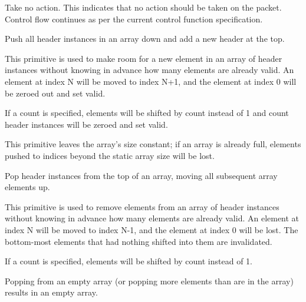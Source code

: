 \documentclass[12pt]{article}
\begin{document}

{ %
Take no action.
}
{ %
}
{ %
This indicates that no action should be taken on the packet. Control flow 
continues as per the current control function specification. 
}


{ %
Push all header instances in an array down and add a new header at the top.
}
{ %
}
{ %
This primitive is used to make room for a new element in an array of header
instances without knowing in advance how many elements are already valid. An
element at index N will be moved to index N+1, and the element at index 0 will
be zeroed out and set valid.


If a count is specified, elements will be shifted by count instead of 1 and
count header instances will be zeroed and set valid.


This primitive leaves the array's size constant; if an array is already full,
elements pushed to indices beyond the static array size will be lost.
}


{ %
Pop header instances from the top of an array, moving all subsequent array elements up.
}
{ %
}
{ %
This primitive is used to remove elements from an array of header instances
without knowing in advance how many elements are already valid. An element at
index N will be moved to index N-1, and the element at index 0 will be lost. The
bottom-most elements that had nothing shifted into them are invalidated.


If a count is specified, elements will be shifted by count instead of 1.


Popping from an empty array (or popping more elements than are in the array)
results in an empty array.
}

\end{document}
